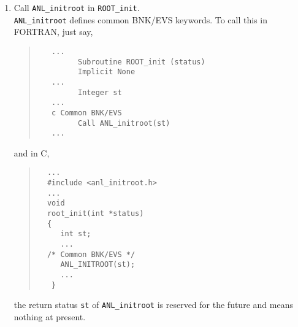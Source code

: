 \begin{enumerate}
\item Call {\tt ANL\_initroot} in {\tt ROOT\_init}. \\
  {\tt ANL\_initroot} defines common BNK/EVS keywords.
  To call this in FORTRAN, just say,
  \begin{quote}\baselineskip 3.2mm\begin{verbatim}
   ...
         Subroutine ROOT_init (status)
         Implicit None
   ...
         Integer st
   ...
   c Common BNK/EVS
         Call ANL_initroot(st)
   ...
  \end{verbatim}\end{quote}
  and in C,
  \begin{quote}\baselineskip 3.2mm\begin{verbatim}
  ...
  #include <anl_initroot.h>
  ...
  void
  root_init(int *status)
  {
     int st;
     ...
  /* Common BNK/EVS */
     ANL_INITROOT(st);
     ...
   }
  \end{verbatim}\end{quote}
  the return status {\tt st} of {\tt ANL\_initroot} is reserved for the future
  and means nothing at present.


\end{enumerate}
